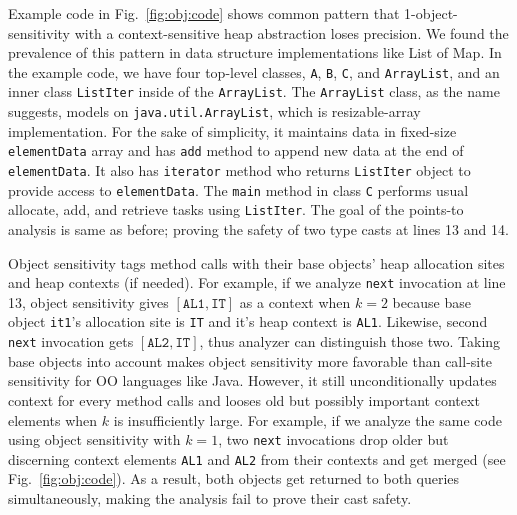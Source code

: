  Example code in Fig.~\ref{fig:obj:code} shows
common pattern that 1-object-sensitivity with a context-sensitive heap
abstraction loses precision. We found the prevalence of this pattern in data
structure implementations like List of Map. In the example code, we have four
top-level classes, \texttt{A}, \texttt{B}, \texttt{C}, and
\texttt{ArrayList}, and an inner class \texttt{ListIter} inside of the
\texttt{ArrayList}. The \texttt{ArrayList} class, as the name suggests,
models on \texttt{java.util.ArrayList}, which is resizable-array
implementation. For the sake of simplicity, it maintains data in fixed-size
\texttt{elementData} array and has \texttt{add} method to append new data at
the end of \texttt{elementData}. It also has \texttt{iterator} method who
returns \texttt{ListIter} object to provide access to \texttt{elementData}.
The \texttt{main} method in class \texttt{C} performs usual allocate, add,
and retrieve tasks using \texttt{ListIter}. The goal of the points-to
analysis is same as before; proving the safety of two type casts at lines 13
and 14.

  Object
sensitivity tags method calls with their base objects' heap allocation sites
and heap contexts (if needed).  For example, if we analyze \texttt{next}
invocation at line 13, object sensitivity gives $[\texttt{AL1}, \texttt{IT}]$
as a context when $k = 2$ because base object \texttt{it1}'s allocation site
is \texttt{IT} and it's heap context is \texttt{AL1}.  Likewise, second
\texttt{next} invocation gets $[\texttt{AL2}, \texttt{IT}]$, thus analyzer
can distinguish those two. Taking base objects into account makes object
sensitivity more favorable than call-site sensitivity for OO languages like
Java. However, it still unconditionally updates context for every method
calls and looses old but possibly important context elements when $k$ is
insufficiently large. For example, if we analyze the same code using object
sensitivity with $k = 1$, two \texttt{next} invocations drop older but
discerning context elements \texttt{AL1} and \texttt{AL2} from their contexts
and get merged (see Fig.~\ref{fig:obj:code}). As a result, both objects get
returned to both queries simultaneously, making the analysis fail to prove
their cast safety.


